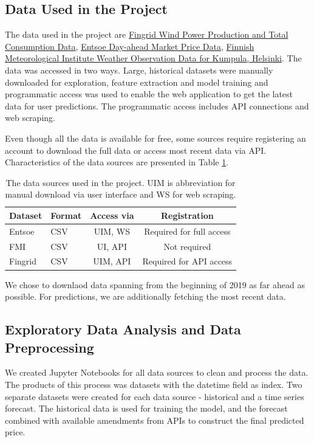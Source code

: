 \documentclass{article}
\begin{document}
\subsection{Data Used in the Project}
\label{subsection:datadescription}

The data used in the project are \href{https://data.fingrid.fi/en}{Fingrid Wind Power Production and Total Consumption Data}, \href{https://transparency.entsoe.eu}{Entsoe Day-ahead Market Price Data}, \href{https://en.ilmatieteenlaitos.fi/open-data}{Finnish Meteorological Institute Weather Observation Data for Kumpula, Helsinki}. The data was accessed in two ways. Large, historical datasets were manually downloaded for exploration, feature extraction and model training and programmatic access was used to enable the web application to get the latest data for user predictions. The programmatic access includes API connections and web scraping.

Even though all the data is available for free, some sources require registering an account to download the full data or access most recent data via API. Characteristics of the data sources are presented in Table \ref{table:data-characteristics}.

\begin{table}[b] 
\centering 
\begin{tabular}{l||l c c} 
Dataset & Format & Access via & Registration\\ 
\hline \hline
Entsoe & CSV & UIM, WS  & Required for full access \\
FMI & CSV & UI, API & Not required \\
Fingrid & CSV & UIM, API & Required for API access \\
\hline
\end{tabular}
\caption{The data sources used in the project. UIM is abbreviation for manual download via user interface and WS for web scraping.}
\label{table:data-characteristics}
\end{table}


We chose to downlaod data spanning from the beginning of 2019 as far ahead as possible.
For predictions, we are additionally fetching the most recent data.

\subsection{Exploratory Data Analysis and Data Preprocessing}
\label{subsection:eda}

We created Jupyter Notebooks for all data sources to clean and process the data.
The products of this process was datasets with the datetime field as index.
Two separate datasets were created for each data source - historical and a time series forecast.
The historical data is used for training the model, and the forecast combined with available amendments from APIs to construct the final predicted price.
\end{document}
